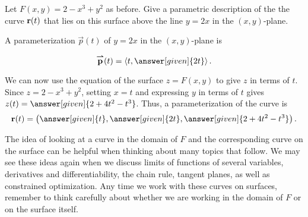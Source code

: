 \documentclass{ximera}
\begin{document}
\begin{example}
  Let $F(x,y) = 2-x^3+y^2$ as before.  Give a parametric
  description of the the curve $\mathbf{r}(t)$ that lies on this surface above the line
  $y=2x$ in the $(x,y)$-plane.
  \begin{explanation}
   A parameterization $\vec{p}(t)$ of $y = 2x$ in the $(x,y)$-plane is 
   
   \[
   \vec{p}(t) = \vector{t, \answer[given]{2t}}.
   \]
    
     We can now use the equation of the surface $z=F(x,y)$ to give $z$ in terms of $t$.  
     Since $z=2-x^3+y^2$, setting $x=t$ and expressing $y$ in terms of $t$ gives 
     $z(t) = \answer[given]{2+4t^2-t^3}$. Thus, a parameterization of the curve is
    \[
    \pt{r}(t) =\point{\answer[given]{t} , \answer[given]{2t}, \answer[given]{2+4t^2-t^3}}.
    \]
  \end{explanation}
\end{example}

The idea of looking at a curve in the domain of $F$ and the corresponding 
curve on the surface can be helpful when thinking about many topics 
that follow.  We may see these ideas again when we discuss limits of 
functions of several variables, derivatives and differentiability, the chain 
rule, tangent planes, as well as constrained optimization.  Any time we work 
with these curves on surfaces, remember to think carefully about whether 
we are working in the domain of $F$ or on the surface itself.
\end{document}
